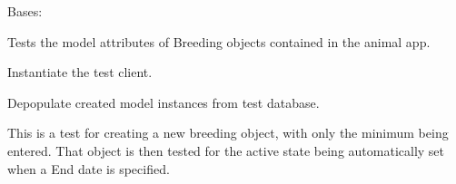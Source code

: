 \documentclass[letterpaper,10pt,english]{sphinxmanual}
\begin{document}

\begin{fulllineitems}
\label{api:mousedb.animal.tests.BreedingModelTests}
Bases: 

Tests the model attributes of Breeding objects contained in the animal app.

\begin{fulllineitems}
\label{api:mousedb.animal.tests.BreedingModelTests.fixtures}
\end{fulllineitems}


\begin{fulllineitems}
\label{api:mousedb.animal.tests.BreedingModelTests.setUp}
Instantiate the test client.

\end{fulllineitems}


\begin{fulllineitems}
\label{api:mousedb.animal.tests.BreedingModelTests.tearDown}
Depopulate created model instances from test database.

\end{fulllineitems}


\begin{fulllineitems}
\label{api:mousedb.animal.tests.BreedingModelTests.test_autoset_active_state}
This is a test for creating a new breeding object, with only the minimum being entered.  That object is then tested for the active state being automatically set when a End date is specified.

\end{fulllineitems}



\end{fulllineitems}
\end{document}
